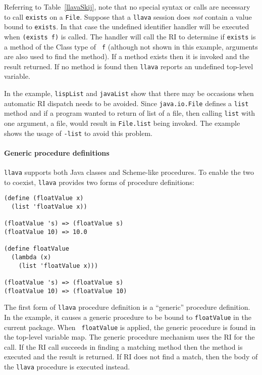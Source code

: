 \documentclass{acm-final/sig-alternate-modified}
\begin{document}
Referring to Table~\ref{llavaSkij}, note that no special syntax or
calls are necessary to call {\tt exists} on a {\tt File}.  Suppose
that a {\tt llava} session does {\em not} contain a value bound to
{\tt exists}. In that case the undefined identifier handler will be
executed when {\tt (exists f)} is called.  The handler will call the
RI to determine if {\tt exists} is a method of the Class type of {\tt
f} (although not shown in this example, arguments are also used to
find the method).  If a method exists then it is invoked and the
result returned.  If no method is found then {\tt llava} reports an
undefined top-level variable.

In the example, {\tt lispList} and {\tt javaList} show that there may
be occasions when automatic RI dispatch needs to be avoided.  Since
{\tt java.io.File} defines a {\tt list} method and if a program wanted
to return of list of a file, then calling {\tt list} with one
argument, a file, would result in {\tt File.list} being invoked.  The
example shows the usage of {\tt -list} to avoid this problem.

\paragraph{Generic procedure definitions}

{\tt llava} supports both Java classes and Scheme-like procedures.  To
enable the two to coexist, {\tt llava} provides two forms of procedure
definitions:

\small
\begin{verbatim}
(define (floatValue x)
  (list 'floatValue x))

(floatValue 's) => (floatValue s)
(floatValue 10) => 10.0

(define floatValue 
  (lambda (x)
    (list 'floatValue x)))

(floatValue 's) => (floatValue s)
(floatValue 10) => (floatValue 10)
\end{verbatim}
\normalsize

The first form of {\tt llava} procedure definition is a ``generic''
procedure definition.  In the example, it causes a generic procedure
to be bound to {\tt floatValue} in the current package.  When {\tt
floatValue} is applied, the generic procedure is found in the
top-level variable map.  The generic procedure mechanism uses the RI
for the call.  If the RI call succeeds in finding a matching method
then the method is executed and the result is returned.  If RI does
not find a match, then the body of the {\tt llava} procedure is
executed instead.
\end{document}
